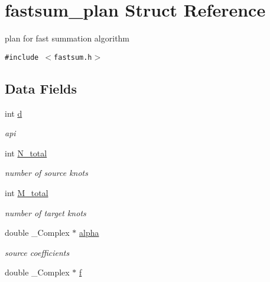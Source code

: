 \hypertarget{structfastsum__plan}{
\section{fastsum\_\-plan Struct Reference}
\label{structfastsum__plan}
}
plan for fast summation algorithm  


{\tt \#include $<$fastsum.h$>$}

\subsection*{Data Fields}
\begin{CompactItemize}
\item 
int \hyperlink{structfastsum__plan_8c32876370be14f7e88337d979c93382}{d}
\begin{CompactList}\small\item\em api \item\end{CompactList}\item 
\hypertarget{structfastsum__plan_45fd4a73ba0f2b5795364d6d3a239a85}{
int \hyperlink{structfastsum__plan_45fd4a73ba0f2b5795364d6d3a239a85}{N\_\-total}}
\label{structfastsum__plan_45fd4a73ba0f2b5795364d6d3a239a85}

\begin{CompactList}\small\item\em number of source knots \item\end{CompactList}\item 
\hypertarget{structfastsum__plan_7c55ef5f14439f86f01b4e06281aa01d}{
int \hyperlink{structfastsum__plan_7c55ef5f14439f86f01b4e06281aa01d}{M\_\-total}}
\label{structfastsum__plan_7c55ef5f14439f86f01b4e06281aa01d}

\begin{CompactList}\small\item\em number of target knots \item\end{CompactList}\item 
\hypertarget{structfastsum__plan_f36c72276fd20ef9c8c1b484f6cbf834}{
double \_\-Complex $\ast$ \hyperlink{structfastsum__plan_f36c72276fd20ef9c8c1b484f6cbf834}{alpha}}
\label{structfastsum__plan_f36c72276fd20ef9c8c1b484f6cbf834}

\begin{CompactList}\small\item\em source coefficients \item\end{CompactList}\item 
\hypertarget{structfastsum__plan_3bb9a1eea981916a97336ac6eb19d292}{
double \_\-Complex $\ast$ \hyperlink{structfastsum__plan_3bb9a1eea981916a97336ac6eb19d292}{f}}
\label{structfastsum__plan_3bb9a1eea981916a97336ac6eb19d292}


\end{CompactItemize}

